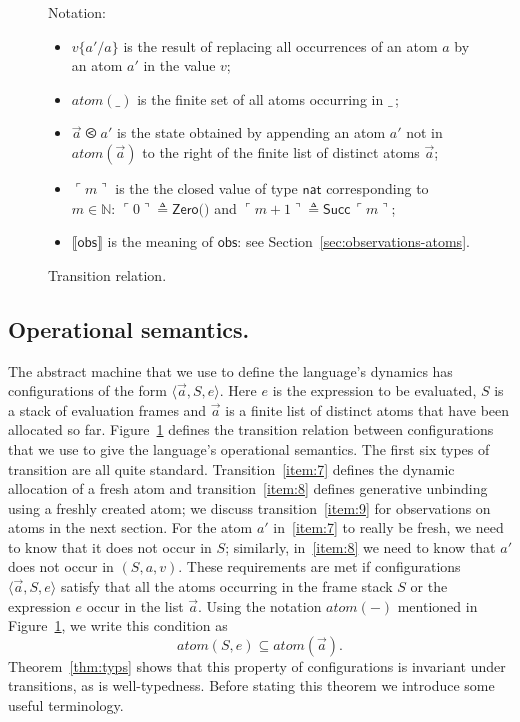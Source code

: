 \documentclass{LMCS}
\theoremstyle{plain}
\theoremstyle{definition}
\newcommand{\atm}[1][a]{#1}
\newcommand{\atoms}{\mathit{atom}}
\newcommand{\CON}[1][C]{\kw{#1}}
\newcommand{\config}[3]{\langle#1, #2, #3\rangle}
\newcommand{\defeq}{\triangleq}
\newcommand{\den}[1]{\llbracket#1\rrbracket}\newcommand{\DIVERGE}{\kw{diverge}}
\renewcommand{\exp}[1][e]{#1}
\newcommand{\LP}{\mathopen{\kw{(}}}
\newcommand{\kw}[1]{\mathsf{#1}}
\newcommand{\NAT}{\kw{nat}}
\newcommand{\NNO}{\mathbb{N}}
\newcommand{\OBS}[1][obs]{\kw{#1}}
\newcommand{\ords}{\olessthan}\newcommand{\PAIR}[2]{\LP#1\mathbin{\kw{,}}#2\RP}
\newcommand{\rename}[2]{\{#2/#1\}}
\newcommand{\rep}[1]{\ulcorner#1\urcorner}
\newcommand{\RP}{\mathclose{\kw{)}}}
\newcommand{\s}[1][a]{\vec{#1}}
\newcommand{\stk}[1][S]{#1}
\newcommand{\UNITVAL}{\LP\RP}
\newcommand{\val}[1][v]{#1}
\begin{document}
\begin{figure}
\begin{enumerate}
  \end{enumerate}
  Notation:
  \begin{itemize}


  \item $\val\rename{\atm}{\atm'}$ is the result of replacing all
    occurrences of an atom $\atm$ by an atom $\atm'$ in the value
    $\val$;
    
  \item $\atoms(\_)$ is the finite set of all atoms occurring in
    $\_\,$;
    
  \item $\s\ords\atm'$ is the state obtained by appending an atom
    $\atm'$ not in $\atoms(\s)$ to the right of the finite list of
    distinct atoms $\s$;
    
  \item $\rep{m}$ is the the closed value of type $\NAT$ corresponding
    to $m\in\NNO$: $\rep{0}\defeq \CON[Zero]\UNITVAL$ and $\rep{m+1}
    \defeq \CON[Succ]\,\rep{m}$;
    
  \item $\den{\OBS}$ is the meaning of $\OBS$: see
    Section~\ref{sec:observations-atoms}.
    
  \end{itemize}
  \caption{Transition relation.}
  \label{fig:trar}
\end{figure}

\subsection*{Operational semantics.}

The abstract machine that we use to define the language's dynamics
has configurations of the form $\config{\s}{\stk}{\exp}$. Here $\exp$
is the expression to be evaluated, $\stk$ is a stack of evaluation
frames and $\s$ is a finite list of distinct atoms that have been
allocated so far. Figure~\ref{fig:trar} defines the transition
relation between configurations that we use to give the language's
operational semantics. The first six types of transition are all quite
standard.  Transition~\ref{item:7} defines the dynamic allocation of a
fresh atom and transition~\ref{item:8} defines generative unbinding
using a freshly created atom; we discuss transition~\ref{item:9} for
observations on atoms in the next section.  For the atom $\atm'$
in~\ref{item:7} to really be fresh, we need to know that it does not
occur in $\stk$; similarly, in~\ref{item:8} we need to know that
$\atm'$ does not occur in $(\stk,\atm,\val)$. These requirements are
met if configurations $\config{\s}{\stk}{\exp}$ satisfy that all the
atoms occurring in the frame stack $\stk$ or the expression $\exp$
occur in the list $\s$. Using the notation $\atoms(-)$ mentioned in
Figure~\ref{fig:trar}, we write this condition as
\begin{equation}
  \label{eq:64}
  \atoms(\stk,\exp)\subseteq\atoms(\s).
\end{equation}
Theorem~\ref{thm:typs} shows that this property of configurations is
invariant under transitions, as is well-typedness. Before stating this
theorem we introduce some useful terminology.
\end{document}
